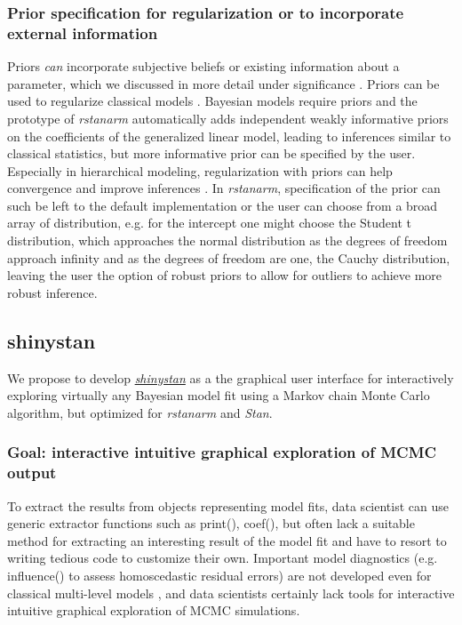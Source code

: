 \documentclass[11pt,notitlepage]{article}
\begin{document}
\subsubsection*{Prior specification for regularization or to incorporate external information}

Priors \textit{can} incorporate subjective beliefs or existing information 
about a parameter,  which we discussed in more detail under significance \cite{carlin1997bayes}. 
Priors can be used to regularize classical models \cite{gelman2008weakly}. 
Bayesian models require priors and the prototype of \textit{rstanarm} 
automatically adds independent weakly 
informative priors on the coefficients of the generalized linear model, 
leading to inferences similar to classical statistics,  but more informative 
prior can be specified by the user. Especially in hierarchical modeling, 
regularization with priors can help convergence and improve inferences 
\cite{Gelman-Hill_2014}. In \textit{rstanarm}, specification of the prior 
can such be left to the default implementation or the user can choose from 
a broad array of distribution, e.g. for the intercept one might choose the 
Student t distribution, which approaches the normal distribution as the 
degrees of freedom approach infinity and as the degrees of freedom are 
one, the Cauchy distribution, leaving the user the option of robust 
priors to allow for outliers to achieve more robust inference. 


\subsection*{shinystan}
We propose to develop \href{http://andrewgelman.com/2015/03/02/introducing-shinystan/}
{\textit{shinystan}} as a the graphical user interface for interactively 
exploring virtually any Bayesian model fit using a Markov chain Monte Carlo algorithm, 
but optimized for \textit{rstanarm} and \textit{Stan}. 

\subsubsection*{Goal: interactive intuitive graphical exploration of MCMC output} 
To extract the results from objects representing model fits, data scientist can 
use generic extractor functions such as print(), coef(), but often lack a suitable 
method for extracting an interesting result of the model fit and have to resort to 
writing tedious code to customize their own. Important model diagnostics 
(e.g. influence() to assess  homoscedastic residual errors) are not 
developed even for classical multi-level models \cite{Galecki2013linear}, 
and data scientists certainly lack tools for interactive intuitive graphical 
exploration of MCMC simulations.
\end{document}

